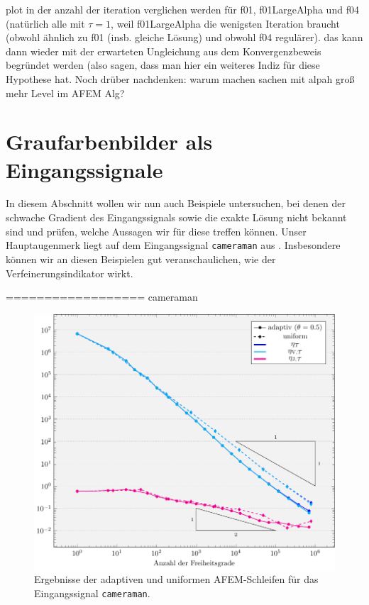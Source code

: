 plot in der anzahl der iteration verglichen werden für f01,
f01LargeAlpha und f04 (natürlich alle mit $\tau=1$, weil  f01LargeAlpha die
wenigsten Iteration braucht (obwohl ähnlich
zu f01 (insb. gleiche Lösung) und obwohl f04 regulärer). 
das kann dann wieder
mit der erwarteten Ungleichung aus dem Konvergenzbeweis begründet werden (also
sagen, dass man hier ein weiteres Indiz für diese Hypothese hat.
Noch drüber nachdenken: warum machen sachen mit alpah groß mehr Level im AFEM
Alg?


\section{Graufarbenbilder als Eingangssignale}
\label{sec:grayscalePicturesAsInputSignal}

In diesem Abschnitt wollen wir nun auch Beispiele untersuchen, bei denen
der schwache Gradient des Eingangssignals sowie die exakte Lösung nicht bekannt
sind und prüfen, welche Aussagen wir für diese treffen können.
Unser Hauptaugenmerk liegt auf dem Eingangssignal \texttt{cameraman} aus
. 
Insbesondere können wir an diesen Beispielen gut veranschaulichen, wie
der Verfeinerungsindikator wirkt.

==================
cameraman 

\begin{figure}[p]
  \centering
  \includegraphics[width=\linewidth]
    {pictures/chapExperiments/secGrayscale/cam/conv.pdf}
  \caption{Ergebnisse der adaptiven und uniformen AFEM-Schleifen für das 
  Eingangssignal \texttt{cameraman}.}
  \label{fig:camConvergence}
\end{figure}

